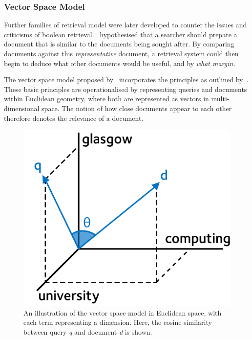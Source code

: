 \subsubsection{Vector Space Model}
Further families of retrieval model were later developed to counter the issues and criticisms of boolean retrieval.~\cite{luhn1957ranking_query} hypothesised that a searcher should prepare a document that is similar to the documents being sought after. By comparing documents against this \emph{representative} document, a retrieval system could then begin to deduce what other documents would be useful, and by \emph{what margin.}

The vector space model proposed by~\cite{salton1975vsm} incorporates the principles as outlined by~\cite{luhn1957ranking_query}. These basic principles are operationalised by representing queries and documents within Euclidean geometry, where both are represented as vectors in multi-dimensional space. The notion of how close documents appear to each other therefore denotes the relevance of a document.

\begin{figure}
    \begin{center}
    \vspace*{-5mm}
    \includegraphics[width=1\textwidth]{figures/ch2-vector.pdf}
    \end{center}
    \vspace*{-4mm}
    \caption[The vector space model (cosine similarity)]{An illustration of the vector space model in Euclidean space, with each term representing a dimension. Here, the cosine similarity between query \emph{q} and document \emph{d} is shown.}
    \label{fig:vector_space}
\end{figure}

